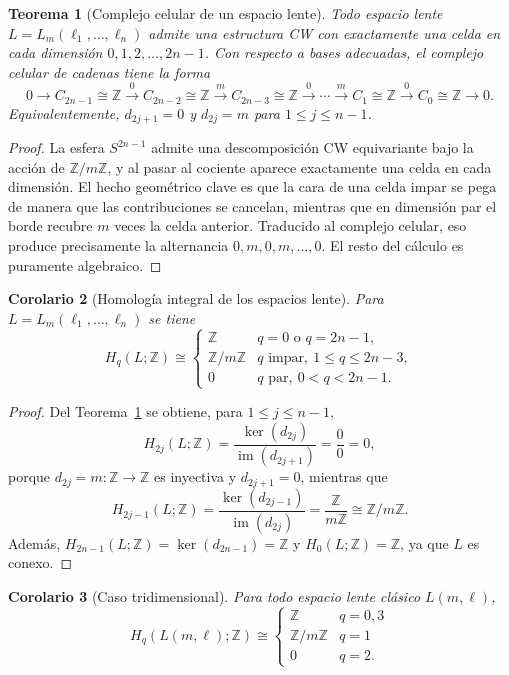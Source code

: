 \documentclass[11pt,a4paper]{article}
\theoremstyle{plain}
\newtheorem{theorem}{Teorema}[section]
\newtheorem{corollary}[theorem]{Corolario}
\theoremstyle{definition}
\theoremstyle{remark}
\newcommand{\ZZ}{\mathbb Z}
\DeclareMathOperator{\im}{im}
\begin{document}
\begin{theorem}[Complejo celular de un espacio lente]
\label{thm:cw-lente}
Todo espacio lente $L=L_m(\ell_1,\dots,\ell_n)$ admite una estructura CW
con exactamente una celda en cada dimensión $0,1,2,\dots,2n-1$. Con
respecto a bases adecuadas, el complejo celular de cadenas tiene la forma
\[
0\to C_{2n-1}\cong\ZZ\xrightarrow{0}C_{2n-2}\cong\ZZ\xrightarrow{m}C_{2n-3}\cong\ZZ\xrightarrow{0}\cdots\xrightarrow{m}C_1\cong\ZZ\xrightarrow{0}C_0\cong\ZZ\to0.
\]
Equivalentemente, $d_{2j+1}=0$ y $d_{2j}=m$ para $1\le j\le n-1$.
\end{theorem}

\begin{proof}
La esfera $S^{2n-1}$ admite una descomposición CW equivariante bajo la
acción de $\ZZ/m\ZZ$, y al pasar al cociente aparece exactamente una celda
en cada dimensión. El hecho geométrico clave es que la cara de una celda
impar se pega de manera que las contribuciones se cancelan, mientras que en
dimensión par el borde recubre $m$ veces la celda anterior. Traducido al
complejo celular, eso produce precisamente la alternancia $0,m,0,m,\dots,0$.
El resto del cálculo es puramente algebraico.
\end{proof}

\begin{corollary}[Homología integral de los espacios lente]
\label{cor:homologia-lente}
Para $L=L_m(\ell_1,\dots,\ell_n)$ se tiene
\[
H_q(L;\ZZ)\cong\begin{cases}
\ZZ & q=0\text{ o }q=2n-1,\\
\ZZ/m\ZZ & q\text{ impar},\ 1\le q\le2n-3,\\
0 & q\text{ par},\ 0<q<2n-1.
\end{cases}
\]
\end{corollary}

\begin{proof}
Del Teorema~\ref{thm:cw-lente} se obtiene, para $1\le j\le n-1$,
\[
H_{2j}(L;\ZZ)=\frac{\ker(d_{2j})}{\im(d_{2j+1})}=\frac{0}{0}=0,
\]
porque $d_{2j}=m:\ZZ\to\ZZ$ es inyectiva y $d_{2j+1}=0$, mientras que
\[
H_{2j-1}(L;\ZZ)=\frac{\ker(d_{2j-1})}{\im(d_{2j})}=\frac{\ZZ}{m\ZZ}\cong\ZZ/m\ZZ.
\]
Además, $H_{2n-1}(L;\ZZ)=\ker(d_{2n-1})=\ZZ$ y $H_0(L;\ZZ)=\ZZ$, ya que $L$
es conexo.
\end{proof}

\begin{corollary}[Caso tridimensional]
\label{cor:homologia-lente-3d}
Para todo espacio lente clásico $L(m,\ell)$,
\[
H_q(L(m,\ell);\ZZ)\cong\begin{cases}\ZZ & q=0,3\\ \ZZ/m\ZZ & q=1\\0 & q=2.\end{cases}
\]
\end{corollary}
\end{document}
